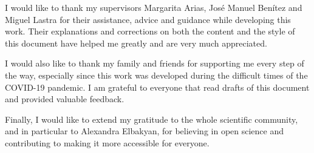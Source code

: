 I would like to thank my supervisors Margarita Arias, José Manuel Benítez and Miguel Lastra for their assistance, advice and guidance while developing this work. Their explanations and corrections on both the content and the style of this document have helped me greatly and are very much appreciated.

I would also like to thank my family and friends for supporting me every step of the way, especially since this work was developed during the difficult times of the COVID-19 pandemic. I am grateful to everyone that read drafts of this document and provided valuable feedback.

Finally, I would like to extend my gratitude to the whole scientific community, and in particular to Alexandra Elbakyan, for believing in open science and contributing to making it more accessible for everyone.
